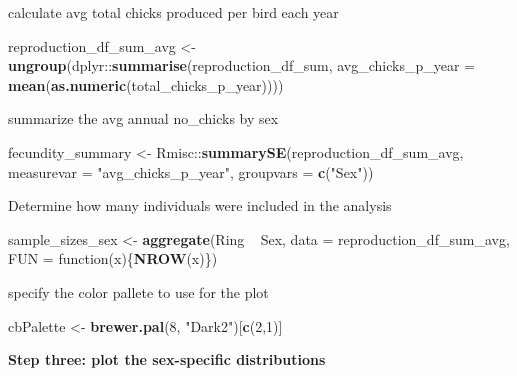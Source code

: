 \documentclass[]{article}
\newenvironment{Shaded}{\begin{snugshade}}{\end{snugshade}}
\newcommand{\KeywordTok}[1]{\textcolor[rgb]{0.13,0.29,0.53}{\textbf{{#1}}}}
\newcommand{\DataTypeTok}[1]{\textcolor[rgb]{0.13,0.29,0.53}{{#1}}}
\newcommand{\DecValTok}[1]{\textcolor[rgb]{0.00,0.00,0.81}{{#1}}}
\newcommand{\StringTok}[1]{\textcolor[rgb]{0.31,0.60,0.02}{{#1}}}
\newcommand{\NormalTok}[1]{{#1}}
\begin{document}
calculate avg total chicks produced per bird each year

\begin{Shaded}
\begin{Highlighting}[]
\NormalTok{reproduction_df_sum_avg <-}\StringTok{ }
\StringTok{  }\KeywordTok{ungroup}\NormalTok{(dplyr::}\KeywordTok{summarise}\NormalTok{(reproduction_df_sum, }
                           \DataTypeTok{avg_chicks_p_year =} \KeywordTok{mean}\NormalTok{(}\KeywordTok{as.numeric}\NormalTok{(total_chicks_p_year))))}
\end{Highlighting}
\end{Shaded}

summarize the avg annual no\_chicks by sex

\begin{Shaded}
\begin{Highlighting}[]
\NormalTok{fecundity_summary <-}\StringTok{ }
\StringTok{  }\NormalTok{Rmisc::}\KeywordTok{summarySE}\NormalTok{(reproduction_df_sum_avg, }
                   \DataTypeTok{measurevar =} \StringTok{"avg_chicks_p_year"}\NormalTok{, }\DataTypeTok{groupvars =} \KeywordTok{c}\NormalTok{(}\StringTok{"Sex"}\NormalTok{))}
\end{Highlighting}
\end{Shaded}

Determine how many individuals were included in the analysis

\begin{Shaded}
\begin{Highlighting}[]
\NormalTok{sample_sizes_sex <-}\StringTok{ }
\StringTok{  }\KeywordTok{aggregate}\NormalTok{(Ring ~}\StringTok{ }\NormalTok{Sex, }\DataTypeTok{data =} \NormalTok{reproduction_df_sum_avg, }\DataTypeTok{FUN =} \NormalTok{function(x)\{}\KeywordTok{NROW}\NormalTok{(x)\})}
\end{Highlighting}
\end{Shaded}

specify the color pallete to use for the plot

\begin{Shaded}
\begin{Highlighting}[]
\NormalTok{cbPalette <-}\StringTok{ }\KeywordTok{brewer.pal}\NormalTok{(}\DecValTok{8}\NormalTok{, }\StringTok{"Dark2"}\NormalTok{)[}\KeywordTok{c}\NormalTok{(}\DecValTok{2}\NormalTok{,}\DecValTok{1}\NormalTok{)]}
\end{Highlighting}
\end{Shaded}

\textbf{Step three: plot the sex-specific distributions}
\end{document}

